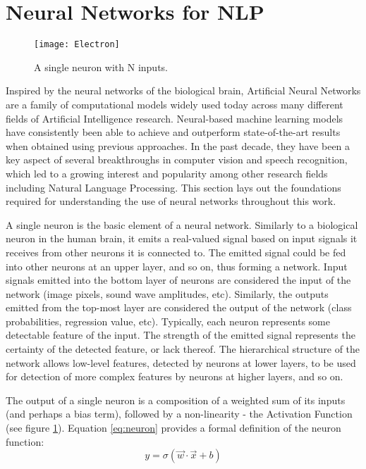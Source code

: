 \section{Neural Networks for NLP}

\begin{figure}
  \centering
    \texttt{[image: Electron]}
  \caption{A single neuron with N inputs.}
  \label{fig:neuron}
\end{figure}

Inspired by the neural networks of the biological brain, Artificial Neural Networks are a family of computational models widely used today across many different fields of Artificial Intelligence research. Neural-based machine learning models have consistently been able to achieve and outperform state-of-the-art results when obtained using previous approaches. In the past decade, they have been a key aspect of several breakthroughs in computer vision and speech recognition, which led to a growing interest and popularity among other research fields including Natural Language Processing. This section lays out the foundations required for understanding the use of neural networks throughout this work.

\medskip

A single neuron is the basic element of a neural network. Similarly to a biological neuron in the human brain, it emits a real-valued signal based on input signals it receives from other neurons it is connected to. The emitted signal could be fed into other neurons at an upper layer, and so on, thus forming a network. Input signals emitted into the bottom layer of neurons are considered the input of the network (image pixels, sound wave amplitudes, etc). Similarly, the outputs emitted from the top-most layer are considered the output of the network (class probabilities, regression value, etc). Typically, each neuron represents some detectable feature of the input. The strength of the emitted signal represents the certainty of the detected feature, or lack thereof. The hierarchical structure of the network allows low-level features, detected by neurons at lower layers, to be used for detection of more complex features by neurons at higher layers, and so on.

\medskip

The output of a single neuron is a composition of a weighted sum of its inputs (and perhaps a bias term), followed by a non-linearity - the Activation Function (see figure \ref{fig:neuron}). Equation \ref{eq:neuron} provides a formal definition of the neuron function:
\begin{equation}
y = \sigma(\vec{w}\cdot\vec{x} + b)
\label{eq:neuron}
\end{equation}

